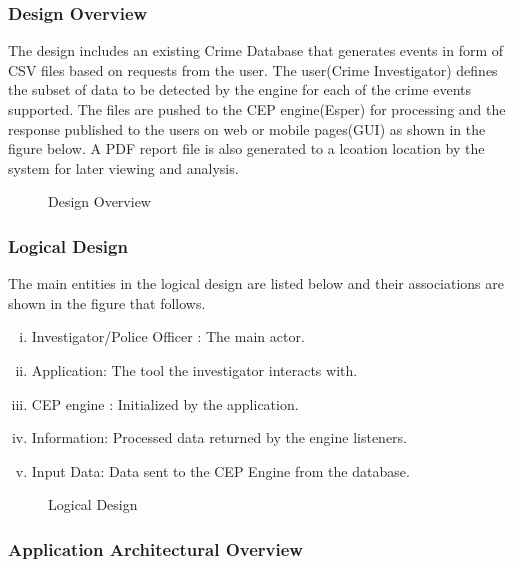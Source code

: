 \subsubsection{Design Overview}

\noindent The design includes an existing Crime Database that generates events in form of CSV files based on requests from the user. The user(Crime Investigator) defines the subset of data to be detected by the engine for each of the crime events supported. The files are pushed to the CEP engine(Esper) for processing and the response published to the users on web or mobile pages(GUI) as shown in the figure below. A PDF report file is also generated to a lcoation location by the system for later viewing and analysis. 

\begin{center}
\begin{figure}[h]
\caption{Design Overview}

\end{figure}
\end{center}

\subsubsection{Logical Design}

\noindent The main entities in the logical design  are listed below and their associations are shown in the figure that follows.

\begin{enumerate}[(i)]
\item Investigator/Police Officer : The main actor.
\item Application: The tool  the investigator interacts with.
\item CEP engine : Initialized by the application.
\item Information: Processed data returned by the engine listeners.
\item Input Data: Data sent to the CEP Engine from the database.
 

 \end{enumerate}

\begin{center}
\begin{figure}[h]
\caption{Logical Design}

\end{figure}
\end{center}
\newpage
\subsubsection{Application Architectural Overview}


